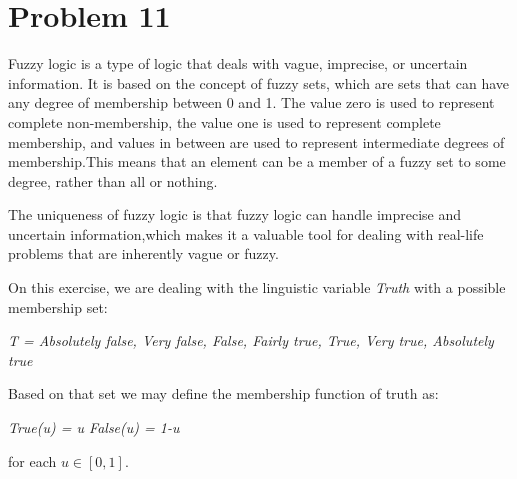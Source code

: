 \section{Problem 11}

Fuzzy logic is a type of logic that deals with vague, imprecise, or uncertain information. It is based on the concept of fuzzy sets, which are sets that can have any degree of membership between 0 and 1.  The value zero is used to represent complete non-membership, the value one is used to represent complete membership, and values in between are used to represent intermediate degrees of membership.This means that an element can be a member of a fuzzy set to some degree, rather than all or nothing.

The uniqueness of fuzzy logic is that fuzzy logic can handle imprecise and uncertain information,which makes it a valuable tool for dealing with real-life problems that are inherently vague or fuzzy. 

On this exercise, we are dealing with the linguistic variable \textit{Truth} with a possible membership set: 

\begin{center}
	\textit{T = {Absolutely false, Very false, False, Fairly true, True, Very true, Absolutely true}}
\end{center}

Based on that set we may define the membership function of truth as:
\begin{center}
	\textit{True(u) = u \hspace{3mm}  False(u) = 1-u}
\end{center}
for each $u \in [0, 1]$.

	





